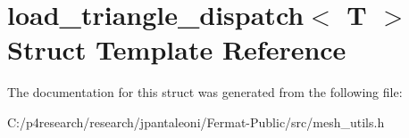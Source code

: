 \hypertarget{structload__triangle__dispatch}{}\section{load\+\_\+triangle\+\_\+dispatch$<$ T $>$ Struct Template Reference}
\label{structload__triangle__dispatch}


The documentation for this struct was generated from the following file\+:\begin{DoxyCompactItemize}
\item 
C\+:/p4research/research/jpantaleoni/\+Fermat-\/\+Public/src/mesh\+\_\+utils.\+h\end{DoxyCompactItemize}
